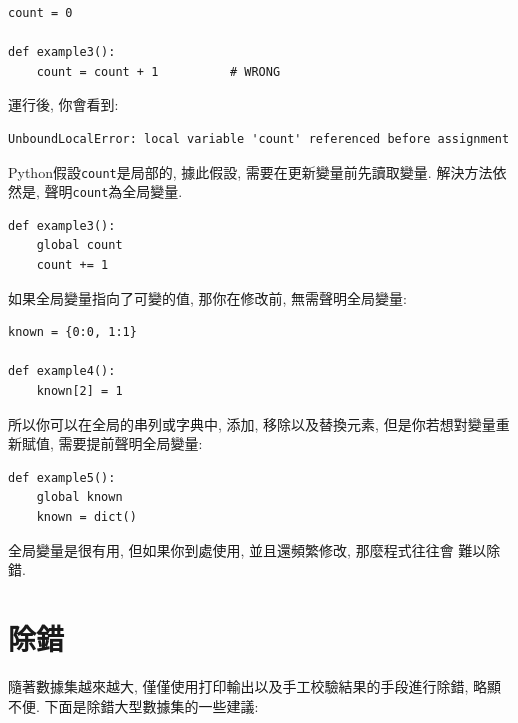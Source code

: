\documentclass[10pt]{book}
\begin{document}
\begin{verbatim}
count = 0

def example3():
    count = count + 1          # WRONG
\end{verbatim}
%
運行後, 你會看到:

\begin{verbatim}
UnboundLocalError: local variable 'count' referenced before assignment
\end{verbatim}
%
Python假設{\tt count}是局部的, 據此假設, 需要在更新變量前先讀取變量. 
解決方法依然是, 聲明{\tt count}為全局變量. 

\begin{verbatim}
def example3():
    global count
    count += 1
\end{verbatim}
%
如果全局變量指向了可變的值, 那你在修改前, 無需聲明全局變量:

\begin{verbatim}
known = {0:0, 1:1}

def example4():
    known[2] = 1
\end{verbatim}
%
所以你可以在全局的串列或字典中, 添加, 移除以及替換元素, 
但是你若想對變量重新賦值, 需要提前聲明全局變量:

\begin{verbatim}
def example5():
    global known
    known = dict()
\end{verbatim}
%
全局變量是很有用, 但如果你到處使用, 並且還頻繁修改, 那麼程式往往會
難以除錯. 


\section{除錯}
隨著數據集越來越大, 僅僅使用打印輸出以及手工校驗結果的手段進行除錯, 略顯不便. 
下面是除錯大型數據集的一些建議:
\end{document}
